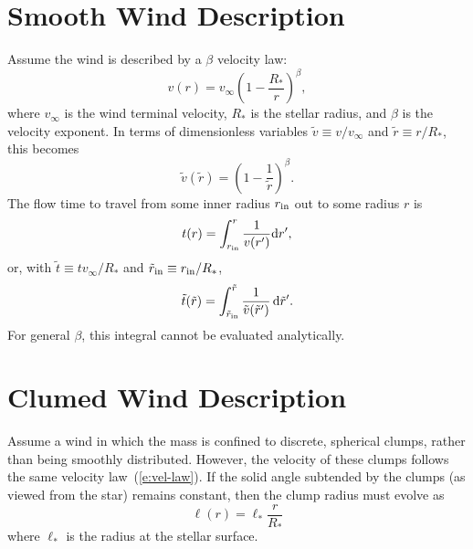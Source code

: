 \documentclass{article}
\newcommand{\vinf}{v_{\infty}}
\newcommand{\Rstar}{R_{\ast}}
\newcommand{\tr}{\tilde{r}}
\newcommand{\tv}{\tilde{v}}
\newcommand{\tti}{\tilde{t}}
\newcommand{\rin}{r_{\rm in}}
\newcommand{\trin}{\tilde{r}_{\rm in}}
\newcommand{\ellstar}{\ell_{\ast}}
\newcommand{\diff}[1]{{\rm d}#1}
\begin{document}
\section*{Smooth Wind Description}

Assume the wind is described by a $\beta$ velocity
law:
%
\begin{equation}
v(r) = \vinf \left( 1 - \frac{\Rstar}{r} \right)^{\beta},
\end{equation}
%
where $\vinf$ is the wind terminal velocity, $\Rstar$ is the stellar
radius, and $\beta$ is the velocity exponent. In terms of
dimensionless variables $\tv \equiv v/\vinf$ and $\tr \equiv r/\Rstar$,
this becomes
%
\begin{equation} \label{e:vel-law}
\tv(\tr) = \left( 1 - \frac{1}{\tr} \right)^{\beta}.
\end{equation}
%
The flow time to travel from some inner radius $\rin$ out to some radius
$r$ is
%
\begin{equation}
t(r) = \int_{\rin}^{r} \frac{1}{v(r')} \diff{r'},
\end{equation}
%
or, with $\tti \equiv t \vinf/\Rstar$ and $\trin \equiv \rin/\Rstar$,
%
\begin{equation} \label{e:trav-time}
\tti(\tr) = \int_{\trin}^{\tr} \frac{1}{\tv(\tr')} \,\diff{\tr'}.
\end{equation}
%
For general $\beta$, this integral cannot be evaluated analytically.

\section*{Clumed Wind Description}

Assume a wind in which the mass is confined to discrete, spherical
clumps, rather than being smoothly distributed. However, the velocity
of these clumps follows the same velocity law~(\ref{e:vel-law}). If
the solid angle subtended by the clumps (as viewed from the star)
remains constant, then the clump radius must evolve as
%
\begin{equation}
  \ell(r) = \ellstar \frac{r}{\Rstar}
\end{equation}
%
where $\ellstar$ is the radius at the stellar surface.
\end{document}

